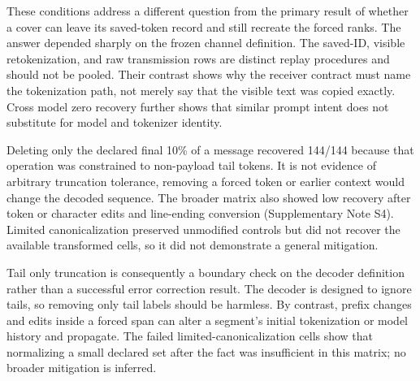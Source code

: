 \documentclass[fleqn,10pt]{wlscirep}
\begin{document}
These conditions address a different question from the primary result of whether a cover can leave its saved-token record and still recreate the forced ranks. The answer depended sharply on the frozen channel definition. The saved-ID, visible retokenization, and raw transmission rows are distinct replay procedures and should not be pooled. Their contrast shows why the receiver contract must name the tokenization path, not merely say that the visible text was copied exactly. Cross model zero recovery further shows that similar prompt intent does not substitute for model and tokenizer identity.

Deleting only the declared final 10\% of a message recovered 144/144 because that operation was constrained to non-payload tail tokens. It is not evidence of arbitrary truncation tolerance, removing a forced token or earlier context would change the decoded sequence. The broader matrix also showed low recovery after token or character edits and line-ending conversion (Supplementary Note S4). Limited canonicalization preserved unmodified controls but did not recover the available transformed cells, so it did not demonstrate a general mitigation.

Tail only truncation is consequently a boundary check on the decoder definition rather than a successful error correction result. The decoder is designed to ignore tails, so removing only tail labels should be harmless. By contrast, prefix changes and edits inside a forced span can alter a segment's initial tokenization or model history and propagate. The failed limited-canonicalization cells show that normalizing a small declared set after the fact was insufficient in this matrix; no broader mitigation is inferred.

\end{document}

